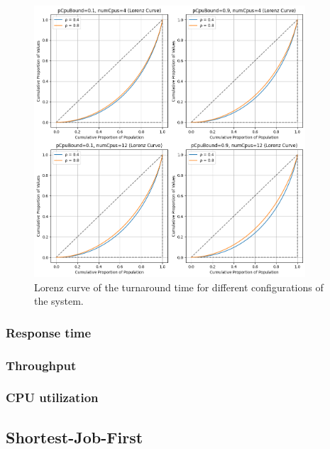 \begin{figure}[H]
    \captionsetup{type=figure}
    \centering
    \includegraphics[width=0.9\textwidth]{./images/04/fcfs/lorenz.png}
    \caption{Lorenz curve of the turnaround time for different configurations of the system.}
    \label{fig:fcfs_lorenz}
\end{figure}

\subsubsection{Response time}
\subsubsection{Throughput}
\subsubsection{CPU utilization}
\subsection{Shortest-Job-First}